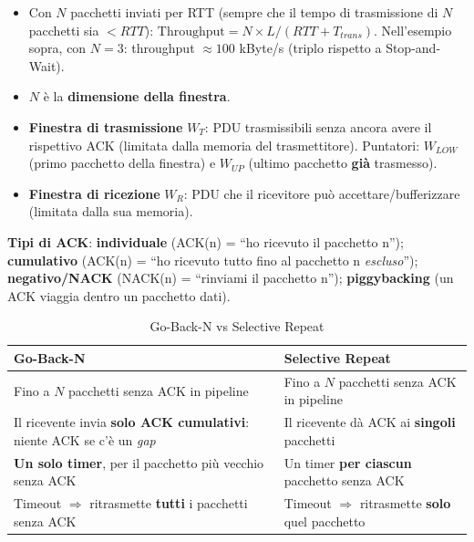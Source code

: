 \documentclass[12pt, a4paper]{article}
\begin{document}
\begin{itemize}
    \item Con $N$ pacchetti inviati per RTT (sempre che il tempo di trasmissione di $N$ pacchetti sia $<RTT$): $\text{Throughput} = N \times L / (RTT+T_{trans})$. Nell'esempio sopra, con $N=3$: throughput $\approx 100$ kByte/s (triplo rispetto a Stop-and-Wait).
    \item $N$ è la \textbf{dimensione della finestra}.
    \item \textbf{Finestra di trasmissione} $W_T$: PDU trasmissibili senza ancora avere il rispettivo ACK (limitata dalla memoria del trasmettitore). Puntatori: $W_{LOW}$ (primo pacchetto della finestra) e $W_{UP}$ (ultimo pacchetto \textbf{già} trasmesso).
    \item \textbf{Finestra di ricezione} $W_R$: PDU che il ricevitore può accettare/bufferizzare (limitata dalla sua memoria).
\end{itemize}

\textbf{Tipi di ACK}: \textbf{individuale} (ACK(n) = ``ho ricevuto il pacchetto n''); \textbf{cumulativo} (ACK(n) = ``ho ricevuto tutto fino al pacchetto n \textit{escluso}''); \textbf{negativo/NACK} (NACK(n) = ``rinviami il pacchetto n''); \textbf{piggybacking} (un ACK viaggia dentro un pacchetto dati).

\begin{table}[H]
\centering
\caption{Go-Back-N vs Selective Repeat}
\small
\begin{tabular}{p{6cm}p{6cm}}
\toprule
\textbf{Go-Back-N} & \textbf{Selective Repeat} \\
\midrule
Fino a $N$ pacchetti senza ACK in pipeline & Fino a $N$ pacchetti senza ACK in pipeline \\
Il ricevente invia \textbf{solo ACK cumulativi}: niente ACK se c'è un \textit{gap} & Il ricevente dà ACK ai \textbf{singoli} pacchetti \\
\textbf{Un solo timer}, per il pacchetto più vecchio senza ACK & Un timer \textbf{per ciascun} pacchetto senza ACK \\
Timeout $\Rightarrow$ ritrasmette \textbf{tutti} i pacchetti senza ACK & Timeout $\Rightarrow$ ritrasmette \textbf{solo} quel pacchetto \\
\bottomrule
\end{tabular}
\end{table}
\end{document}
